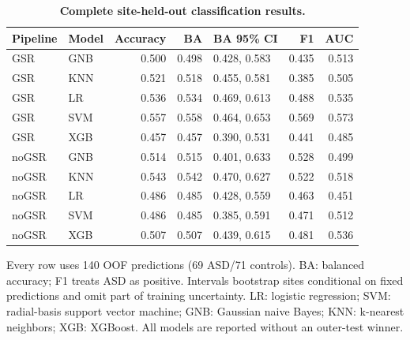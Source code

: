 \begin{table}[H]
\centering\small
\caption{\textbf{Complete site-held-out classification results.}}\label{tab:classification}
\begin{tabular}{llrrlrr}
\toprule
Pipeline & Model & Accuracy & BA & BA 95\% CI & F1 & AUC \\
\midrule
GSR & GNB & 0.500 & 0.498 & 0.428, 0.583 & 0.435 & 0.513 \\
GSR & KNN & 0.521 & 0.518 & 0.455, 0.581 & 0.385 & 0.505 \\
GSR & LR & 0.536 & 0.534 & 0.469, 0.613 & 0.488 & 0.535 \\
GSR & SVM & 0.557 & 0.558 & 0.464, 0.653 & 0.569 & 0.573 \\
GSR & XGB & 0.457 & 0.457 & 0.390, 0.531 & 0.441 & 0.485 \\
noGSR & GNB & 0.514 & 0.515 & 0.401, 0.633 & 0.528 & 0.499 \\
noGSR & KNN & 0.543 & 0.542 & 0.470, 0.627 & 0.522 & 0.518 \\
noGSR & LR & 0.486 & 0.485 & 0.428, 0.559 & 0.463 & 0.451 \\
noGSR & SVM & 0.486 & 0.485 & 0.385, 0.591 & 0.471 & 0.512 \\
noGSR & XGB & 0.507 & 0.507 & 0.439, 0.615 & 0.481 & 0.536 \\
\bottomrule
\end{tabular}
\begin{flushleft}\footnotesize
Every row uses 140 OOF predictions (69 ASD/71 controls). BA: balanced accuracy; F1 treats ASD as positive. Intervals bootstrap sites conditional on fixed predictions and omit part of training uncertainty. LR: logistic regression; SVM: radial-basis support vector machine; GNB: Gaussian naive Bayes; KNN: k-nearest neighbors; XGB: XGBoost. All models are reported without an outer-test winner.
\end{flushleft}
\end{table}
